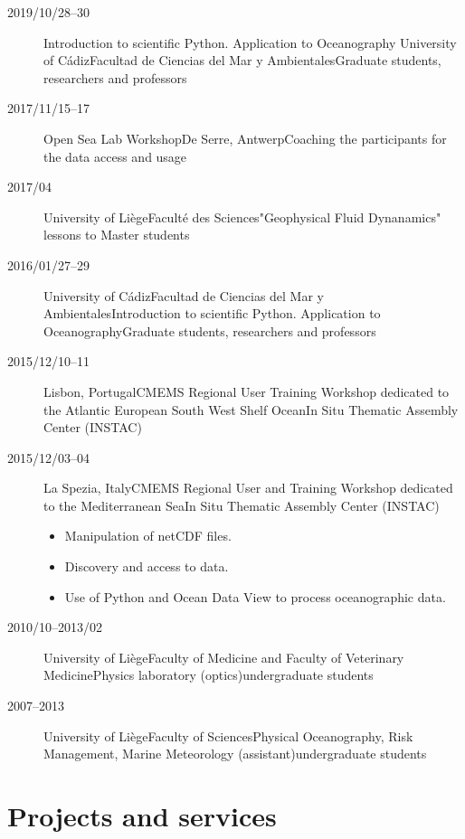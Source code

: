 \documentclass[11pt,a4paper,svgnames]{article}
\begin{document}
\begin{description}

\item[2019/10/28--30] {Introduction to scientific Python. Application to Oceanography} {University of C\'{a}diz}{Facultad de Ciencias del Mar y Ambientales}{Graduate students, researchers and professors}{}

\item[2017/11/15--17] {Open Sea Lab Workshop}{De Serre, Antwerp}{Coaching the participants for the data access and usage}{}{}

\item[2017/04] {University of Li\`{e}ge}{Facult\'{e} des Sciences}{"Geophysical Fluid Dynanamics" lessons to Master students}{}{}

\item[2016/01/27--29] {University of C\'{a}diz}{Facultad de Ciencias del Mar y Ambientales}{Introduction to scientific Python. Application to Oceanography}{Graduate students, researchers and professors}{}

\item[2015/12/10--11] {Lisbon, Portugal}{CMEMS Regional User Training Workshop dedicated to the Atlantic European South West Shelf Ocean}{In Situ Thematic Assembly Center (INSTAC)}{}{}
\item[2015/12/03--04] {La Spezia, Italy}{CMEMS Regional User and Training Workshop dedicated to the Mediterranean Sea}{In Situ Thematic Assembly Center (INSTAC)}{}{
\begin{itemize}
\item Manipulation of netCDF files.
\item Discovery and access to data.
\item Use of Python and Ocean Data View to process oceanographic data.
\end{itemize}
}
\item[2010/10--2013/02]{University of Li\`{e}ge}{Faculty of Medicine and Faculty of Veterinary Medicine}{Physics laboratory (optics)}{undergraduate students}{}
\item[2007--2013]{University of Li\`{e}ge}{Faculty of Sciences}{Physical Oceanography, Risk Management, Marine Meteorology (assistant)}{undergraduate students}

\end{description}


\section{Projects and services}
\end{document}

